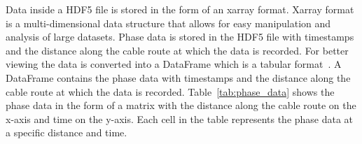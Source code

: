 Data inside a HDF5 file is stored in the form of an xarray format. Xarray format is a multi-dimensional data structure that allows for easy manipulation and analysis of large datasets. Phase data is stored in the HDF5 file with timestamps and the distance along the cable route at which the data is recorded. For better viewing the data is converted into a DataFrame which is a tabular format~\cite{mckinney2010data}. A DataFrame contains the phase data with timestamps and the distance along the cable route at which the data is recorded. Table~\ref{tab:phase_data} shows the phase data in the form of a matrix with the distance along the cable route on the x-axis and time on the y-axis. Each cell in the table represents the phase data at a specific distance and time. 

\begin{table}[ht]
  \centering
  \caption{Phase data from the HDF5 file in the DataFrame format}
  \label{tab:phase_data}
\end{table}

